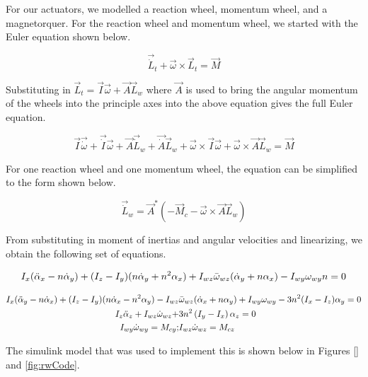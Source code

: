 For our actuators, we modelled a reaction wheel, momentum wheel, and a magnetorquer. For the reaction wheel and momentum wheel, we started with the Euler equation shown below.

\begin{equation}
    \Vec{\dot L}_t + \Vec{\omega} \times \Vec{L}_t = \Vec{M}
\end{equation}

Substituting in $\Vec{L}_t = \Vec{I} \Vec{\omega} + \Vec{A} \Vec{L}_w$ where $\Vec{A}$ is used to bring the angular momentum of the wheels into the principle axes into the above equation gives the full Euler equation.

\begin{equation}
    \Vec{I} \Vec{\dot \omega} + \Vec{\dot I} \Vec{\omega} + \Vec{A} \Vec{\dot L}_w + \Vec{\dot A} \Vec{L}_w + \Vec{\omega} \times \Vec{I} \Vec{\omega} + \Vec{\omega} \times \Vec{A} \Vec{L}_w = \Vec{M}
\end{equation}

For one reaction wheel and one momentum wheel, the equation can be simplified to the form shown below.

\begin{equation}
    \Vec{\dot L}_w = \Vec{A}^* \left( - \Vec{M}_c - \Vec{\omega} \times \Vec{A} \Vec{L}_w \right)
\end{equation}

From substituting in moment of inertias and angular velocities and linearizing, we obtain the following set of equations.

\begin{align}
    I_x (\Ddot{\alpha}_x - n \dot \alpha_y ) + (I_z - I_y) ( n \dot \alpha_y + n^2 \alpha_x ) + I_{wz}\Bar{\omega}_{wz} ( \dot \alpha_y + n \alpha_x) - I_{wy} \omega_{wy} n = 0
\end{align}

\begin{align*}
    I_x (\Ddot{\alpha}_y - n \dot \alpha_x ) + (I_z - I_y) ( n \dot \alpha_x - n^2 \alpha_y ) - I_{wz}&\Bar{\omega}_{wz} ( \dot \alpha_x + n \alpha_y) + I_{wy} \omega_{wy} - 3 n^2 (I_x - I_z) \alpha_y = 0 \\
    I_z \Ddot{\alpha}_z + I_{wz} \dot \omega_{wz} +& 3n^2\left( I_y - I_x \right) \alpha_z = 0 \\
    I_{wy} \dot \omega_{wy} = M_{cy} ;& I_{wz} \dot \omega_{wz} = M_{cz}
\end{align*}


The simulink model that was used to implement this is shown below in Figures \ref{} and \ref{fig:rwCode}.


